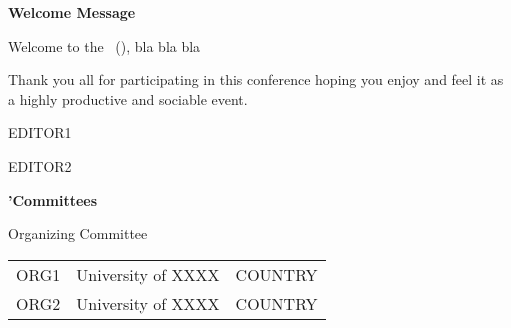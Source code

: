 \documentclass[letterpaper,oneside]{book}
\renewcommand{\headrulewidth}{0.0pt}
\begin{document}
\newpage
\cfoot{\small \textbf{\thepage}}
\pagestyle{fancy}
\fancypagestyle{plain}{%
\fancyhf{} %
\fancyhead[L]{\small \textbf{\headerlineone\newline
       \headerlinetwo\newline
       \headerlinethree}}
\fancyfoot[C]{\small \textbf{\thepage}} %
\renewcommand{\headrulewidth}{0pt}
\renewcommand{\footrulewidth}{0pt}
}
\lhead{\small \textbf{\headerlineone\newline
       \headerlinetwo\newline
       \headerlinethree}}

\newpage
\null\vspace{0.5cm}
{}
\begin{center}
{\LARGE \bfseries Welcome Message}
\end{center}

\vspace{0.5cm}

\begin{onehalfspacing}
{
\setlength{\parskip}{0.25cm} 

Welcome to the \year\ \conferencename (\acronym), bla bla bla 

Thank you all for participating in this conference hoping you enjoy and feel it as a highly productive and sociable event.

}

\vspace{0.6cm}

EDITOR1

EDITOR2
 
\end{onehalfspacing}
\newpage

{\LARGE \bfseries \acronym'\year Committees}
\vspace{0.5cm}
{}

{\Large Organizing Committee}
\vspace{0.2cm}

\begin{tabular}{lll}
ORG1        & University of XXXX  & COUNTRY\\
ORG2        & University of XXXX  & COUNTRY\\
\end{tabular}

\vspace{0.5cm}
\end{document}
